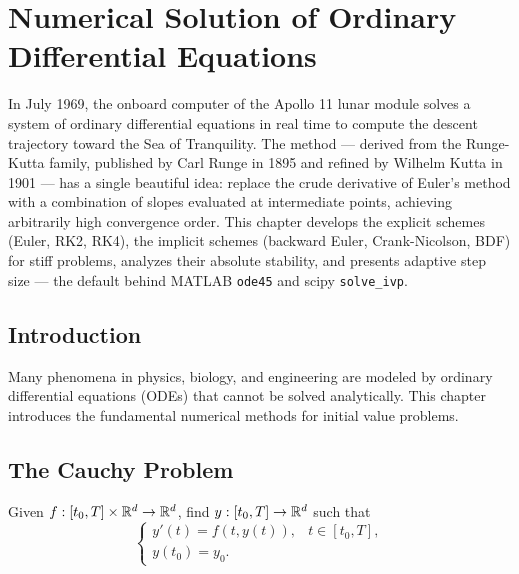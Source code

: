 
\chapter{Numerical Solution of Ordinary Differential Equations}
\label{ch:ode}


In July 1969, the onboard computer of the Apollo 11 lunar module solves a system of ordinary differential equations in real time to compute the descent trajectory toward the Sea of Tranquility. The method --- derived from the Runge-Kutta family, published by Carl Runge in 1895 and refined by Wilhelm Kutta in 1901 --- has a single beautiful idea: replace the crude derivative of Euler's method with a combination of slopes evaluated at intermediate points, achieving arbitrarily high convergence order. This chapter develops the explicit schemes (Euler, RK2, RK4), the implicit schemes (backward Euler, Crank-Nicolson, BDF) for stiff problems, analyzes their absolute stability, and presents adaptive step size --- the default behind MATLAB \texttt{ode45} and scipy \texttt{solve\_ivp}.

\section{Introduction}

Many phenomena in physics, biology, and engineering are modeled by ordinary differential equations (ODEs) that cannot be solved analytically. This chapter introduces the fundamental numerical methods for initial value problems.

\section{The Cauchy Problem}

\begin{definition}
\label{def:cauchy}
Given $f: [t_0, T] \times \mathbb{R}^d \to \mathbb{R}^d$, find $y: [t_0, T] \to \mathbb{R}^d$ such that
\[
    \begin{cases}
        y'(t) = f(t, y(t)), & t \in [t_0, T], \\
        y(t_0) = y_0.
    \end{cases}
\]
\end{definition}

